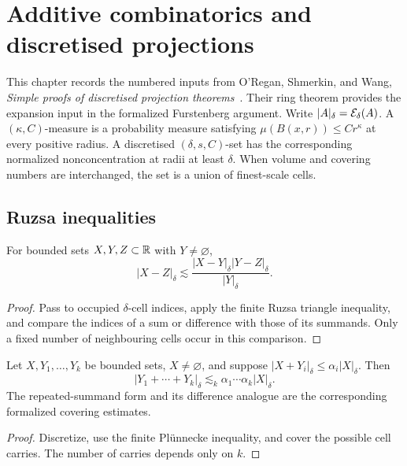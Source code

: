 \chapter{Additive combinatorics and discretised projections}
\label{chap:discrete-projections}

This chapter records the numbered inputs from O'Regan, Shmerkin, and
Wang, \emph{Simple proofs of discretised projection theorems}~\cite{OSW25}.
Their ring theorem provides the expansion input in the formalized
Furstenberg argument. Write $|A|_\delta=\mathcal{E}_\delta(A)$. A
$(\kappa,C)$-measure is a probability measure satisfying
$\mu(B(x,r))\leq Cr^\kappa$ at every positive radius. A discretised
$(\delta,s,C)$-set has the corresponding normalized nonconcentration
at radii at least $\delta$. When volume and covering numbers are
interchanged, the set is a union of finest-scale cells.

\section{Ruzsa inequalities}

\begin{lemma}
\label{lem:ruzsa-triangle}
\leanok
For bounded sets $X,Y,Z\subset\mathbb{R}$ with $Y\ne\varnothing$,
\[
           |X-Z|_\delta\lesssim
                    \frac{|X-Y|_\delta|Y-Z|_\delta}{|Y|_\delta}.
\]
\end{lemma}
\begin{proof}
\leanok
Pass to occupied $\delta$-cell indices, apply the finite Ruzsa
triangle inequality, and compare the indices of a sum or difference
with those of its summands. Only a fixed number of neighbouring
cells occur in this comparison.
\end{proof}

\begin{proposition}
\label{prop:pluennecke}
Let $X,Y_1,\ldots,Y_k$ be bounded sets, $X\ne\varnothing$, and
suppose $|X+Y_i|_\delta\leq\alpha_i|X|_\delta$. Then
\[
        |Y_1+\cdots+Y_k|_\delta
                  \lesssim_k\alpha_1\cdots\alpha_k|X|_\delta.
\]
The repeated-summand form and its difference analogue are the
corresponding formalized covering estimates.
\end{proposition}
\begin{proof}
Discretize, use the finite Pl\"unnecke inequality, and cover the
possible cell carries. The number of carries depends only on $k$.
\end{proof}

